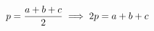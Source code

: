 \documentclass[preview]{standalone}
\begin{document}
\begin{align*}
\special{dvisvgm:raw <g id='unique000'>}p = \frac{a+b+c}{2} \implies 2p = a+b+c\special{dvisvgm:raw </g>}
\end{align*}
\end{document}

